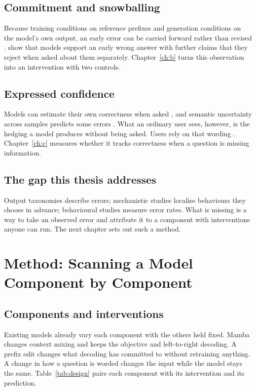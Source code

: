 \documentclass[11pt,a4paper,oneside]{report}
\begin{document}
\section{Commitment and snowballing}
Because training conditions on reference prefixes and generation conditions on the model's own output, an early error can be carried forward rather than revised \citep{bengio2015,ranzato2016,wang2020}. \citet{zhang2024snowball} show that models support an early wrong answer with further claims that they reject when asked about them separately. Chapter~\ref{ch:b} turns this observation into an intervention with two controls.

\section{Expressed confidence}
Models can estimate their own correctness when asked \citep{kadavath2022}, and semantic uncertainty across samples predicts some errors \citep{farquhar2024}. What an ordinary user sees, however, is the hedging a model produces without being asked. Users rely on that wording \citep{zhou2023}. Chapter~\ref{ch:c} measures whether it tracks correctness when a question is missing information.

\section{The gap this thesis addresses}
Output taxonomies describe errors; mechanistic studies localise behaviours they choose in advance; behavioural studies measure error rates. What is missing is a way to take an observed error and attribute it to a component with interventions anyone can run. The next chapter sets out such a method.

\chapter{Method: Scanning a Model Component by Component}
\label{ch:method}

\section{Components and interventions}
Existing models already vary each component with the others held fixed. Mamba changes context mixing and keeps the objective and left-to-right decoding. A prefix edit changes what decoding has committed to without retraining anything. A change in how a question is worded changes the input while the model stays the same. Table~\ref{tab:design} pairs each component with its intervention and its prediction.
\end{document}
